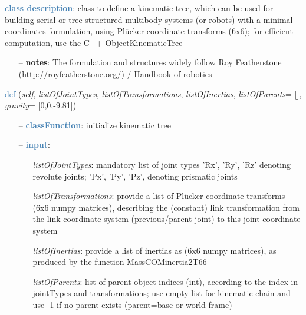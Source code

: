 \begin{itemize}[leftmargin=1.4cm]
\begin{itemize}[leftmargin=1.4cm]
\begin{itemize}[leftmargin=1.4cm]
\begin{itemize}[leftmargin=0.5cm]
\begin{itemize}[leftmargin=1.4cm]
\begin{itemize}[leftmargin=1.4cm]
\begin{itemize}[leftmargin=0.5cm]
\begin{itemize}[leftmargin=1.4cm]
\begin{itemize}[leftmargin=0.5cm]
\begin{itemize}[leftmargin=1.4cm]
\begin{itemize}[leftmargin=1.4cm]
\begin{itemize}[leftmargin=1.4cm]
%
\noindent\textcolor{steelblue}{{\bf class description}}:  class to define a kinematic tree, which can be used for building serial or tree-structured multibody systems
         (or robots) with a minimal coordinates formulation, using Pl\"ucker coordinate transforms (6x6); for efficient computation, use the C++ ObjectKinematicTree
\setlength{\itemindent}{0.7cm}
\begin{itemize}[leftmargin=0.7cm]
\item[--]
{\bf notes}: The formulation and structures widely follow Roy Featherstone (http://royfeatherstone.org/) / Handbook of robotics \cite{Siciliano2016}
\vspace{24pt}\end{itemize}
%
\begin{flushleft}
\noindent \textcolor{steelblue}{def {\bf {}}}\label{sec:kinematicTree:KinematicTree66:__init__}
({\it self}, {\it listOfJointTypes}, {\it listOfTransformations}, {\it listOfInertias}, {\it listOfParents}= [], {\it gravity}= [0,0,-9.81])
\end{flushleft}
\setlength{\itemindent}{0.7cm}
\begin{itemize}[leftmargin=0.7cm]
\item[--]\textcolor{steelblue}{\bf classFunction}: initialize kinematic tree
\item[--]\textcolor{steelblue}{\bf input}: \vspace{-6pt}
\begin{itemize}[leftmargin=1.2cm]
\setlength{\itemindent}{-0.7cm}
\item[]{\it listOfJointTypes}: mandatory list of joint types 'Rx', 'Ry', 'Rz' denoting revolute joints; 'Px', 'Py', 'Pz', denoting prismatic joints
\item[]{\it listOfTransformations}: provide a list of Pl\"ucker coordinate transforms (6x6 numpy matrices), describing the (constant) link transformation from the link coordinate system (previous/parent joint) to this joint coordinate system
\item[]{\it listOfInertias}: provide a list of inertias as (6x6 numpy matrices), as produced by the function MassCOMinertia2T66
\item[]{\it listOfParents}: list of parent object indices (int), according to the index in jointTypes and transformations; use empty list for kinematic chain and use -1 if no parent exists (parent=base or world frame)

\end{itemize}
\end{itemize}
\end{itemize}
\end{itemize}
\end{itemize}
\end{itemize}
\end{itemize}
\end{itemize}
\end{itemize}
\end{itemize}
\end{itemize}
\end{itemize}
\end{itemize}
\end{itemize}
